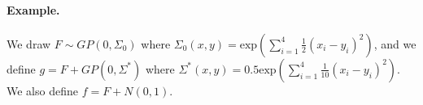 \documentclass[12pt,english]{article}
\begin{document}
\paragraph{Example.}

We draw $F\sim GP\left(0,\Sigma_{0}\right)$ where $\Sigma_{0}\left(x,y\right)=\mbox{exp}\left(\sum_{i=1}^{4}\frac{1}{2}\left(x_{i}-y_{i}\right)^{2}\right)$,
and we define $g=F+GP\left(0,\Sigma^{*}\right)$ where $\Sigma^{*}\left(x,y\right)=0.5\mbox{exp}\left(\sum_{i=1}^{4}\frac{1}{10}\left(x_{i}-y_{i}\right)^{2}\right)$.
We also define $f=F+N\left(0,1\right)$. 
\end{document}
